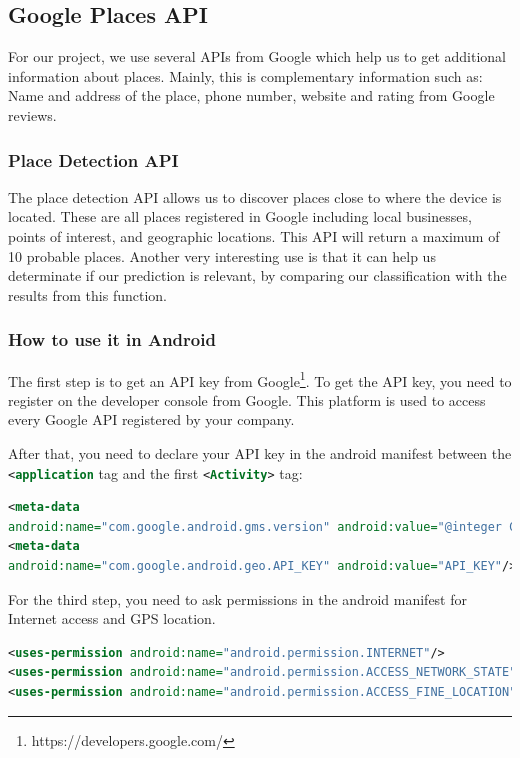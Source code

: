 \subsection{Google Places API}
For our project, we use several APIs from Google which help us to get additional information about places. Mainly, this is complementary information such as: Name and address of the place, phone number, website and rating from Google reviews.

\subsubsection{Place Detection API}
The place detection API allows us to discover places close to where the device is located. These are all places registered in Google including local businesses, points of interest, and geographic locations. This API will return a maximum of 10 probable places.
Another very interesting use is that it can help us determinate if our prediction is relevant, by comparing our classification with the results from this function.

\subsubsection{How to use it in Android}
The first step is to get an API key from Google\footnote{https://developers.google.com/}. To get the API key, you need to register on the developer console from Google. This platform is used to access every Google API registered by your company.

After that, you need to declare your API key in the android manifest between the \lstinline[language=XML]{<application} tag and the first \lstinline[language=XML]{<Activity>} tag:

\begin{lstlisting}[language=XML, basicstyle=\scriptsize]
<meta-data
android:name="com.google.android.gms.version" android:value="@integer Google_play_services_version"/>
<meta-data
android:name="com.google.android.geo.API_KEY" android:value="API_KEY"/>
\end{lstlisting}

For the third step, you need to ask permissions in the android manifest for Internet access and GPS location.
\begin{lstlisting}[language=XML, basicstyle=\scriptsize]
<uses-permission android:name="android.permission.INTERNET"/>
<uses-permission android:name="android.permission.ACCESS_NETWORK_STATE"/>
<uses-permission android:name="android.permission.ACCESS_FINE_LOCATION"/>
\end{lstlisting}

